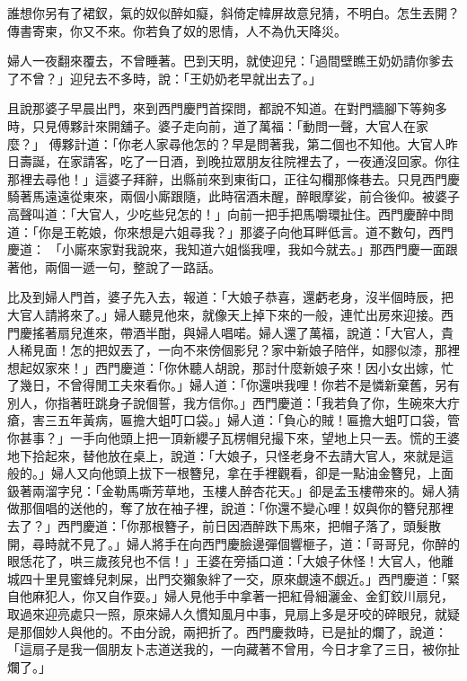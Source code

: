 \begin{showcontents}{}
誰想你另有了裙釵，氣的奴似醉如癡，斜倚定幃屏故意兒猜，不明白。怎生丟開？傳書寄柬，你又不來。你若負了奴的恩情，人不為仇天降災。

婦人一夜翻來覆去，不曾睡著。巴到天明，就使迎兒：「過間壁瞧王奶奶請你爹去了不曾？」迎兒去不多時，說：「王奶奶老早就出去了。」

且說那婆子早晨出門，來到西門慶門首探問，都說不知道。在對門牆腳下等夠多時，只見傅夥計來開舖子。婆子走向前，道了萬福：「動問一聲，大官人在家麼？」 傅夥計道：「你老人家尋他怎的？早是問著我，第二個也不知他。大官人昨日壽誕，在家請客，吃了一日酒，到晚拉眾朋友往院裡去了，一夜通沒回家。你往那裡去尋他！」這婆子拜辭，出縣前來到東街口，正往勾欄那條巷去。只見西門慶騎著馬遠遠從東來，兩個小廝跟隨，此時宿酒未醒，醉眼摩娑，前合後仰。被婆子高聲叫道：「大官人，少吃些兒怎的！」向前一把手把馬嚼環扯住。西門慶醉中問道：「你是王乾娘，你來想是六姐尋我？」那婆子向他耳畔低言。道不數句，西門慶道： 「小廝來家對我說來，我知道六姐惱我哩，我如今就去。」那西門慶一面跟著他，兩個一遞一句，整說了一路話。

比及到婦人門首，婆子先入去，報道：「大娘子恭喜，還虧老身，沒半個時辰，把大官人請將來了。」婦人聽見他來，就像天上掉下來的一般，連忙出房來迎接。西門慶搖著扇兒進來，帶酒半酣，與婦人唱喏。婦人還了萬福，說道：「大官人，貴人稀見面！怎的把奴丟了，一向不來傍個影兒？家中新娘子陪伴，如膠似漆，那裡想起奴家來！」西門慶道：「你休聽人胡說，那討什麼新娘子來！因小女出嫁，忙了幾日，不曾得閒工夫來看你。」婦人道：「你還哄我哩！你若不是憐新棄舊，另有別人，你指著旺跳身子說個誓，我方信你。」西門慶道：「我若負了你，生碗來大疔瘡，害三五年黃病，匾擔大蛆叮口袋。」婦人道：「負心的賊！匾擔大蛆叮口袋，管你甚事？」一手向他頭上把一頂新纓子瓦楞帽兒撮下來，望地上只一丟。慌的王婆地下拾起來，替他放在桌上，說道：「大娘子，只怪老身不去請大官人，來就是這般的。」婦人又向他頭上拔下一根簪兒，拿在手裡觀看，卻是一點油金簪兒，上面鈒著兩溜字兒：「金勒馬嘶芳草地，玉樓人醉杏花天。」卻是孟玉樓帶來的。婦人猜做那個唱的送他的，奪了放在袖子裡，說道：「你還不變心哩！奴與你的簪兒那裡去了？」西門慶道：「你那根簪子，前日因酒醉跌下馬來，把帽子落了，頭髮散開，尋時就不見了。」婦人將手在向西門慶臉邊彈個響榧子，道：「哥哥兒，你醉的眼恁花了，哄三歲孩兒也不信！」王婆在旁插口道：「大娘子休怪！大官人，他離城四十里見蜜蜂兒刺屎，出門交獺象絆了一交，原來覷遠不覷近。」西門慶道：「緊自他麻犯人，你又自作耍。」婦人見他手中拿著一把紅骨細灑金、金釘鉸川扇兒，取過來迎亮處只一照，原來婦人久慣知風月中事，見扇上多是牙咬的碎眼兒，就疑是那個妙人與他的。不由分說，兩把折了。西門慶救時，已是扯的爛了，說道：「這扇子是我一個朋友卜志道送我的，一向藏著不曾用，今日才拿了三日，被你扯爛了。」


\end{showcontents}
